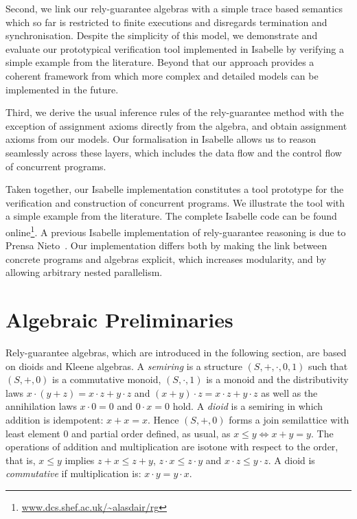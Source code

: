 \documentclass{llncs}
\begin{document}
Second, we link our rely-guarantee algebras with a simple trace based
semantics which so far is restricted to finite executions and
disregards termination and synchronisation. Despite the simplicity of
this model, we demonstrate and evaluate our prototypical verification
tool implemented in Isabelle by verifying a simple example from
the literature. Beyond that our approach provides a coherent framework
from which more complex and detailed models can be implemented in the
future.

Third, we derive the usual inference rules of the rely-guarantee
method with the exception of assignment axioms directly from the
algebra, and obtain assignment axioms from our models. Our
formalisation in Isabelle allows us to reason seamlessly across these
layers, which includes the data flow and the control flow of concurrent
programs.

Taken together, our Isabelle implementation constitutes a tool
prototype for the verification and construction of concurrent
programs. We illustrate the tool with a simple example from the
literature. The complete Isabelle code can be found
online\footnote{\url{www.dcs.shef.ac.uk/~alasdair/rg}}. A
previous Isabelle implementation of rely-guarantee reasoning is due to
Prensa Nieto~\cite{nieto_rely-guarantee_2003}. Our implementation
differs both by making the link between concrete programs and algebras
explicit, which increases modularity, and by allowing arbitrary nested parallelism.

\section{Algebraic Preliminaries}
\label{sec:KA}

Rely-guarantee algebras, which are introduced in the following
section, are based on dioids and Kleene algebras. A \emph{semiring} is
a structure $(S,+,\cdot,0,1)$ such that $(S,+,0)$ is a commutative
monoid, $(S,\cdot, 1)$ is a monoid and the distributivity laws $x\cdot
(y+z)=x\cdot z + y \cdot z$ and $(x+y)\cdot z = x\cdot z+y\cdot z$ as
well as the annihilation laws $x\cdot 0=0$ and $0\cdot x=0$ hold. A
\emph{dioid} is a semiring in which addition is idempotent:
$x+x=x$. Hence $(S,+,0)$ forms a join semilattice with least element
$0$ and partial order defined, as usual, as $x\le y\Leftrightarrow
x+y=y$. The operations of addition and multiplication are isotone with
respect to the order, that is, $x \le y $ implies $z+x\le z+y$,
$z\cdot x \le z\cdot y$ and $x\cdot z \le y\cdot z$. A dioid is
\emph{commutative} if multiplication is: $x\cdot y = y \cdot x$.
\end{document}
